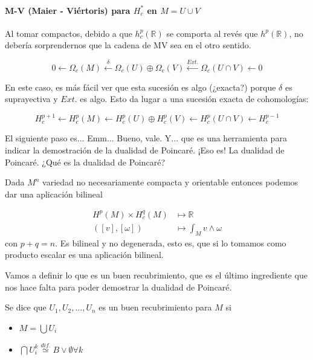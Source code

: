 \documentclass[palatino, bibnumbers]{apuntes}
\begin{document}
\paragraph{M-V (Maier - Viértoris) para $H^\ast_c$ en $M=U\cup V$}

Al tomar compactos, debido a que $h^p_c(ℝ)$ se comporta al revés que $h^p(ℝ)$, no debería sorprendernos que la cadena de MV sea en el otro sentido.

\[
	0 \leftarrow Ω_c(M) \overset{δ}{\leftarrow} Ω_c(U) \oplus Ω_c(V) \overset{Ext.}{\leftarrow} Ω_c(U\cap V) \leftarrow 0
\]

En este caso, es más fácil ver que esta sucesión es algo (¿exacta?) porque $δ$ es suprayectiva y $Ext.$ es algo.
Esto da lugar a una sucesión exacta de cohomologías:

\[
	H_c^{p+1} \leftarrow H_c^p(M) \leftarrow H_c^p(U) \oplus H_c^p(V) \leftarrow H_c^p(U\cap V) \leftarrow H_c^{p-1}
\]


El siguiente paso es... Emm... Bueno, vale. Y... que es una herramienta para indicar la demostración de la dualidad de Poincaré. ¡Eso es! La dualidad de Poincaré. ¿Qué es la dualidad de Poincaré?

\begin{lemma}


 Dada $M^n$ variedad no necesariamente compacta y orientable entonces podemos dar una aplicación bilineal

 \begin{align*}
	H^p(M) × H_c^q(M) &\longmapsto ℝ \\
	([v],[ω]) & \longmapsto \int_M v ∧ ω
\end{align*}
con $p + q = n$.
Es bilineal y no degenerada, esto es, que si lo tomamos como producto escalar es una aplicación bilineal.
\end{lemma}

Vamos a definir lo que es un buen recubrimiento, que es el último ingrediente que nos hace falta para poder demostrar la dualidad de Poincaré.

\begin{defn}
Se dice que $U_1,U_2,...,U_n$ es un buen recubrimiento para $M$ si

\begin{itemize}
 	\item $ M =\bigcup U_i$
 	\item $\bigcap U_i^k \overset{dif.}{\simeq} B \vee \emptyset ∀k$
 \end{itemize}
\end{defn}
\end{document}
